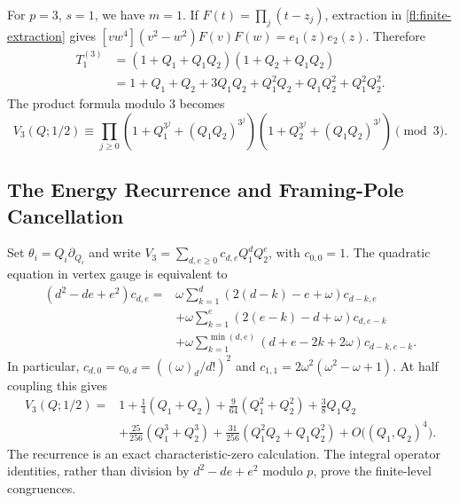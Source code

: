 \documentclass[11pt]{amsart}
\theoremstyle{definition}
\theoremstyle{remark}
\numberwithin{equation}{section}
\begin{document}
For $p=3$, $s=1$, we have $m=1$. If
$F(t)=\prod_j(t-z_j)$, extraction in \eqref{fl:finite-extraction}
gives $[vw^4](v^2-w^2)F(v)F(w)=e_1(z)e_2(z)$.
Therefore
\begin{equation}\label{fl:p3-polynomial}
\begin{split}
 T_1^{(3)}&=(1+Q_1+Q_1Q_2)(1+Q_2+Q_1Q_2)\\
 &=1+Q_1+Q_2+3Q_1Q_2+Q_1^2Q_2+Q_1Q_2^2+Q_1^2Q_2^2.
\end{split}
\end{equation}
The product formula modulo $3$ becomes
\begin{equation}\label{fl:product}
 V_3(Q;1/2)\equiv\prod_{j\geq0}
 (1+Q_1^{3^j}+(Q_1Q_2)^{3^j})
 (1+Q_2^{3^j}+(Q_1Q_2)^{3^j})\pmod3.
\end{equation}

\subsection{The Energy Recurrence and Framing-Pole Cancellation}
Set $\theta_i=Q_i\partial_{Q_i}$ and write
$V_3=\sum_{d,e\geq0}c_{d,e}Q_1^dQ_2^e$, with $c_{0,0}=1$.
The quadratic equation in vertex gauge is equivalent to
\begin{equation}\label{fl:energy-recurrence}
\begin{split}
 (d^2-de+e^2)c_{d,e}={}&
 \omega\sum_{k=1}^{d}(2(d-k)-e+\omega)c_{d-k,e}\\
 &+\omega\sum_{k=1}^{e}(2(e-k)-d+\omega)c_{d,e-k}\\
 &+\omega\sum_{k=1}^{\min(d,e)}
 (d+e-2k+2\omega)c_{d-k,e-k}.
\end{split}
\end{equation}
In particular,
$c_{d,0}=c_{0,d}=((\omega)_d/d!)^2$ and
$c_{1,1}=2\omega^2(\omega^2-\omega+1)$.
At half coupling this gives
\begin{equation}\label{fl:initial-coefficients}
\begin{split}
 V_3(Q;1/2)={}&1+\frac14(Q_1+Q_2)
 +\frac9{64}(Q_1^2+Q_2^2)+\frac38Q_1Q_2\\
 &+\frac{25}{256}(Q_1^3+Q_2^3)
 +\frac{31}{256}(Q_1^2Q_2+Q_1Q_2^2)
 +O\bigl((Q_1,Q_2)^4\bigr).
\end{split}
\end{equation}
The recurrence is an exact characteristic-zero calculation.
The integral operator identities, rather than division by
$d^2-de+e^2$ modulo $p$, prove the finite-level congruences.
\end{document}
